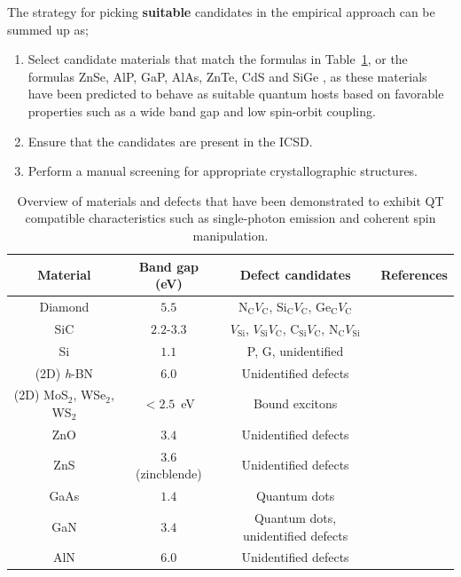 \documentclass[superscriptaddress,unsortedaddress,
 amsmath,amssymb,
 aps,
]{revtex4-2}
\begin{document}
The strategy for picking \textbf{suitable} candidates in the empirical approach can be summed up as;  
\begin{enumerate}
    \item Select candidate materials that match the formulas in  Table~\ref{tab:qt-materials}, or the formulas ZnSe, AlP, GaP, AlAs, ZnTe, CdS \cite{Weber2010} and SiGe \cite{Hardy2019}, as these materials have been predicted to behave as suitable quantum hosts based on favorable properties such as a wide band gap and low spin-orbit coupling.  
    \item Ensure that the candidates are present in the ICSD.  
    \item Perform a manual screening for appropriate crystallographic structures. 
\end{enumerate}

\begin{table}[b]
    \centering 
    \caption{Overview of materials and defects that have been demonstrated to exhibit QT compatible characteristics such as single-photon emission and coherent spin manipulation.}
    \begin{tabular}{c|c|c|c}
    Material & Band gap (eV) & Defect candidates & References \\
    \hline
    Diamond  & $5.5$  & N$_\mathrm{C}V_\mathrm{C}$, Si$_\mathrm{C}V_\mathrm{C}$, Ge$_\mathrm{C}V_\mathrm{C}$ & \cite{Taylor2008,Balasubramanian_2009,Barclay2011,Gordon2013,Rogers_2014,Bhaskar_2018} \\ 
    SiC & $2.2$-$3.3$ & $V_\mathrm{Si}$, $V_\mathrm{Si}V_\mathrm{C}$, C$_\mathrm{Si}V_\mathrm{C}$, N$_\mathrm{C}V_\mathrm{Si}$ & \cite{Widmann2014,Christle_2015,Castelletto_2014,Zargaleh_2018}  \cite{Weber2010, Son2020, Falk2013} \\ 
    Si & $1.1$ & P, G, unidentified & \cite{Muhonen_2014,Durand_2020,Redjem2020} \\ 
    (2D) \textit{h}-BN & $6.0$ & Unidentified defects & \cite{Tran_2016,Tran_2016b,Hayee_2020} \\ 
    (2D) MoS$_2$, WSe$_2$, WS$_2$ & $<2.5$~eV & Bound excitons & \cite{Toth2019} \\
    ZnO & $3.4$ & Unidentified defects & \cite{Morfa2012} \\ 
    ZnS & $3.6$ (zincblende) & Unidentified defects & \cite{Stewart2019} \\ 
    GaAs & $1.4$ & Quantum dots & \cite{Bluhm2010} \\ 
    GaN & $3.4$ & Quantum dots, unidentified defects & \cite{Roux2017,Berhane2018} \\
    AlN & $6.0$ & Unidentified defects & \cite{Xue2020}\\
    \end{tabular}
    \label{tab:qt-materials}
\end{table} 
\end{document}
